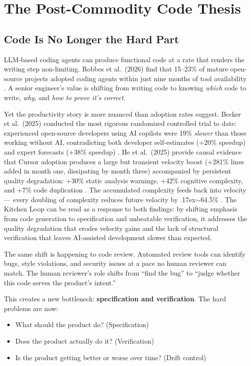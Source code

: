 \documentclass[11pt,a4paper]{article}
\newcommand{\roughly}{{\textraisebox{.17ex}{$\scriptstyle\sim$}}}
\newcommand{\textraisebox}[2]{\leavevmode\raise#1\hbox{#2}}
\begin{document}
\section{The Post-Commodity Code Thesis}\label{sec:post-commodity-code-thesis}

\subsection{Code Is No Longer the Hard Part}\label{sec:code-is-no-longer-the-hard-part}

LLM-based coding agents can produce functional code at a rate that renders the writing step non-limiting. Robbes et al.~(2026) find that 15--23\% of mature open-source projects adopted coding agents within just nine months of tool availability \cite{robbes2026}. A senior engineer's value is shifting from writing code to knowing \emph{which} code to write, \emph{why}, and \emph{how to prove it's correct}.

Yet the productivity story is more nuanced than adoption rates suggest. Becker et al.~(2025) conducted the most rigorous randomized controlled trial to date: experienced open-source developers using AI copilots were 19\% \emph{slower} than those working without AI, contradicting both developer self-estimates (+20\% speedup) and expert forecasts (+38\% speedup) \cite{becker2025}. He et al.~(2025) provide causal evidence that Cursor adoption produces a large but transient velocity boost (+281\% lines added in month one, dissipating by month three) accompanied by persistent quality degradation: +30\% static analysis warnings, +42\% cognitive complexity, and +7\% code duplication \cite{he2025}. The accumulated complexity feeds back into velocity --- every doubling of complexity reduces future velocity by \roughly64.5\% \cite{he2025}. The Kitchen Loop can be read as a response to both findings: by shifting emphasis from code generation to specification and unbeatable verification, it addresses the quality degradation that erodes velocity gains and the lack of structural verification that leaves AI-assisted development slower than expected.

The same shift is happening to code review. Automated review tools can identify bugs, style violations, and security issues at a pace no human reviewer can match. The human reviewer's role shifts from ``find the bug'' to ``judge whether this code serves the product's intent.''

This creates a new bottleneck: \textbf{specification and verification}. The hard problems are now:
\begin{itemize}[nosep]
\item What should the product do? (Specification)
\item Does the product actually do it? (Verification)
\item Is the product getting better or worse over time? (Drift control)
\end{itemize}
\end{document}
